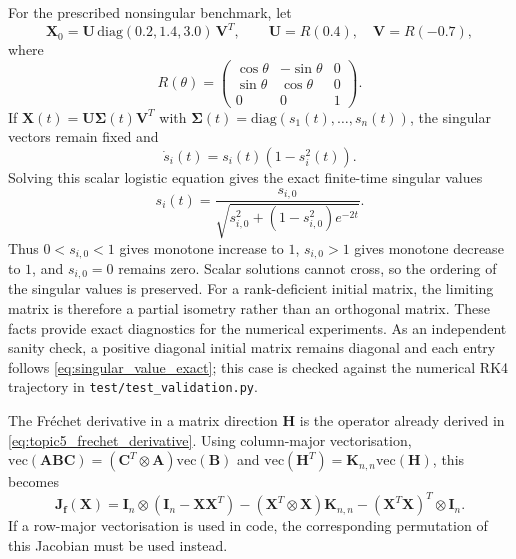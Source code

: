 For the prescribed nonsingular benchmark, let
\begin{equation}
\label{eq:topic5_benchmark}
\mathbf{X}_0=\mathbf{U}\,\mathrm{diag}(0.2,1.4,3.0)\,\mathbf{V}^T,
\qquad \mathbf{U}=R(0.4),\quad \mathbf{V}=R(-0.7),
\end{equation}
where
\begin{equation*}
R(\theta)=\begin{pmatrix}\cos\theta&-\sin\theta&0\\ \sin\theta&\cos\theta&0\\ 0&0&1\end{pmatrix}.
\end{equation*}
If
$\mathbf{X}(t)=\mathbf{U}\boldsymbol{\Sigma}(t)\mathbf{V}^T$ with
$\boldsymbol{\Sigma}(t)=\mathrm{diag}(s_1(t),\ldots,s_n(t))$, the singular vectors remain fixed and
\begin{equation}
\label{eq:singular_value_ode}
\dot{s}_i(t)=s_i(t)\left(1-s_i^2(t)\right).
\end{equation}
Solving this scalar logistic equation gives the exact finite-time singular values
\begin{equation}
\label{eq:singular_value_exact}
s_i(t)=\frac{s_{i,0}}{\sqrt{s_{i,0}^2+\left(1-s_{i,0}^2\right)e^{-2t}}}.
\end{equation}
Thus $0<s_{i,0}<1$ gives monotone increase to $1$, $s_{i,0}>1$ gives monotone decrease to $1$, and $s_{i,0}=0$ remains zero. Scalar solutions cannot cross, so the ordering of the singular values is preserved. For a rank-deficient initial matrix, the limiting matrix is therefore a partial isometry rather than an orthogonal matrix. These facts provide exact diagnostics for the numerical experiments. As an independent sanity check, a positive diagonal initial matrix remains diagonal and each entry follows \eqref{eq:singular_value_exact}; this case is checked against the numerical RK4 trajectory in \texttt{test/test\_validation.py}.

The Fr\'echet derivative in a matrix direction $\mathbf{H}$ is the
operator already derived in \eqref{eq:topic5_frechet_derivative}.
Using column-major vectorisation, $\mathrm{vec}(\mathbf{A}\mathbf{B}\mathbf{C})=(\mathbf{C}^T\otimes\mathbf{A})\mathrm{vec}(\mathbf{B})$ and $\mathrm{vec}(\mathbf{H}^T)=\mathbf{K}_{n,n}\mathrm{vec}(\mathbf{H})$, this becomes
\begin{equation}
\label{eq:analytic_jacobian_kron}
\mathbf{J}_{\mathbf{f}}(\mathbf{X})
=\mathbf{I}_n\otimes\left(\mathbf{I}_n-\mathbf{X}\mathbf{X}^T\right)
-\left(\mathbf{X}^T\otimes\mathbf{X}\right)\mathbf{K}_{n,n}
-\left(\mathbf{X}^T\mathbf{X}\right)^T\otimes\mathbf{I}_n.
\end{equation}
If a row-major vectorisation is used in code, the corresponding permutation of this Jacobian must be used instead.

